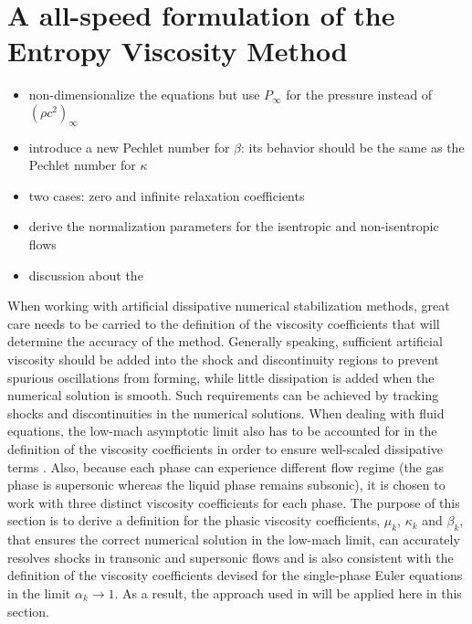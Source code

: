 \documentclass[preprint,10pt]{elsarticle}
\begin{document}
\section{A all-speed formulation of the Entropy Viscosity Method}\label{sec:low-Mach}
\begin{itemize}
\item non-dimensionalize the equations but use $P_\infty$ for the pressure instead of $(\rho c^2)_\infty$
\item introduce a new Pechlet number for $\beta$: its behavior should be the same as the Pechlet number for $\kappa$
\item two cases: zero and infinite relaxation coefficients
\item derive the normalization parameters for the isentropic and non-isentropic flows
\item discussion about the 
\end{itemize}
%
When working with artificial dissipative numerical stabilization methods, great care needs to be carried to the definition of the viscosity coefficients that will determine the accuracy of the method. Generally speaking, sufficient artificial viscosity should be added into the shock and discontinuity regions to prevent spurious oscillations from forming, while little dissipation is added when the numerical solution is smooth. Such requirements can be achieved by tracking shocks and discontinuities in the numerical solutions. When dealing with fluid equations, the low-mach asymptotic limit also has to be accounted for in the definition of the viscosity coefficients in order to ensure well-scaled dissipative terms \cite{LowMach1, LowMach2, LowMach3}. Also, because each phase can experience different flow regime (the gas phase is supersonic whereas the liquid phase remains subsonic), it is chosen to work with three distinct viscosity coefficients for each phase. The purpose of this section is to derive a definition for the phasic viscosity coefficients, $\mu_k$, $\kappa_k$ and $\beta_k$, that ensures the correct numerical solution in the low-mach limit, can accurately resolves shocks in transonic and supersonic flows and is also consistent with the definition of the viscosity coefficients devised for the single-phase Euler equations in the limit $\alpha_k \to 1$. As a result, the approach used in \cite{Marco_paper_low_mach} will be applied here in this section. 
\end{document}
